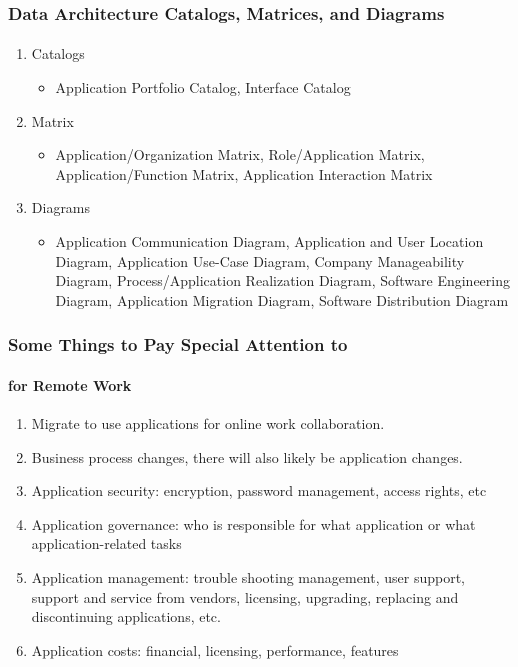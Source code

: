\documentclass[aspectratio=169, table]{beamer}
\begin{document}
    \begin{frame}
        \frametitle{Data Architecture Catalogs, Matrices, and Diagrams}
        \framesubtitle{\hspace{1cm}}
        \begin{enumerate}
            \item Catalogs
            \begin{itemize}
                \item Application Portfolio Catalog, Interface Catalog
            \end{itemize}
            \item Matrix
            \begin{itemize}
                \item Application/Organization Matrix, Role/Application Matrix, Application/Function Matrix, Application Interaction Matrix
            \end{itemize}
            \item Diagrams
            \begin{itemize}
                \item Application Communication Diagram, Application and User Location Diagram, Application Use-Case Diagram, Company Manageability Diagram, Process/Application Realization Diagram, Software Engineering Diagram, Application Migration Diagram, Software Distribution Diagram
            \end{itemize}
        \end{enumerate}
    \end{frame}


\begin{frame}
    \frametitle{Some Things to Pay Special Attention to}
    \framesubtitle{for Remote Work}
    \begin{enumerate}
        \item Migrate to use applications for online work collaboration.
        \item Business process changes, there will also likely be application changes.
        \item Application security: encryption, password management, access rights, etc
        \item Application governance: who is responsible for what application or what application-related tasks
        \item Application management: trouble shooting management, user support, support and service from vendors, licensing, upgrading, replacing and discontinuing applications, etc.
        \item Application costs: financial, licensing, performance, features
    \end{enumerate}
\end{frame}
\end{document}
